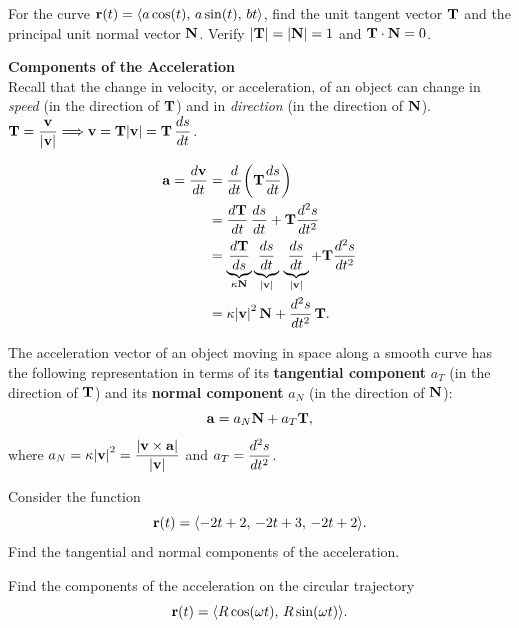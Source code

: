 \documentclass[mathNotesPreamble]{subfiles}
\begin{document}
  \begin{ex*}
    For the curve ${\mathbf{r}}(t)={\left\langle a\cos(t),\,a\sin(t),\,bt \right\rangle}$, find the unit tangent vector ${\mathbf{T}}$ and the principal unit normal vector ${\mathbf{N}}$. Verify ${\left\vert{\mathbf{T}}\right\vert}={\left\vert{\mathbf{N}}\right\vert}=1$ and ${\mathbf{T}}\cdot{\mathbf{N}}=0$.
  \end{ex*}

  \pagebreak

  \textbf{Components of the Acceleration}\\
  Recall that the change in velocity, or acceleration, of an object can change in \textit{speed} (in the direction of ${\mathbf{T}}$) and in \textit{direction} (in the direction of ${\mathbf{N}}$).
  $\displaystyle{\mathbf{T}}=\frac{{\mathbf{v}}}{{\left\vert{\mathbf{v}}\right\vert}} \Longrightarrow {\mathbf{v}}={\mathbf{T}}{\left\vert{\mathbf{v}}\right\vert}={\mathbf{T}}\,\frac{ds}{dt}$.

  \begin{align*}
    {\mathbf{a}}= \frac{d{\mathbf{v}}}{dt}&={\frac{d^{}}{dt^{}}}{\left({\mathbf{T}}\frac{ds}{dt}\right)}\\
      &=\frac{d{\mathbf{T}}}{dt}\,\frac{ds}{dt}+{\mathbf{T}}\frac{d^2s}{dt^2}\\
      &=\underbrace{\frac{d{\mathbf{T}}}{ds}}_{\kappa {\mathbf{N}}}\underbrace{\frac{ds}{dt}}_{{\left\vert{\mathbf{v}}\right\vert}}\,\underbrace{\frac{ds}{dt}}_{{\left\vert{\mathbf{v}}\right\vert}}+{\mathbf{T}} \frac{d^2s}{dt^2}\\
      &=\kappa{\left\vert{\mathbf{v}}\right\vert}^2\, {\mathbf{N}}+\frac{d^2s}{dt^2}\,{\mathbf{T}}.
  \end{align*}   
  
  \begin{thmBox*}
    The acceleration vector of an object moving in space along a smooth curve has the following representation in terms of its \textbf{tangential component} $a_T$ (in the direction of ${\mathbf{T}}$) and its \textbf{normal component} $a_N$ (in the direction of ${\mathbf{N}}$):
      \[{\mathbf{a}}=a_N{\mathbf{N}}+a_T{\mathbf{T}},\]
    where $a_N=\kappa{\left\vert{\mathbf{v}}\right\vert}^2=\displaystyle\frac{{\left\vert{\mathbf{v}}\times{\mathbf{a}}\right\vert}}{{\left\vert{\mathbf{v}}\right\vert}}$ and $a_T=\displaystyle\frac{d^2s}{dt^2}$.
  \end{thmBox*}
  \pagebreak

  \begin{ex*}
    Consider the function
      \[{\mathbf{r}}(t)={\left\langle -2t+2,\,-2t+3,\,-2t+2 \right\rangle}.\]
    Find the tangential and normal components of the acceleration.
  \end{ex*}

  \begin{ex*}
    Find the components of the acceleration on the circular trajectory
      \[{\mathbf{r}}(t)={\left\langle R\cos(\omega t),\,R\sin(\omega t) \right\rangle}.\]
  \end{ex*}
  \pagebreak
\end{document}
